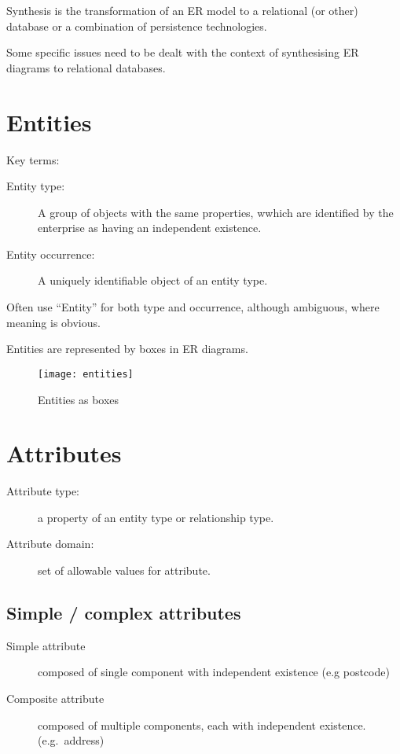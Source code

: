 \documentclass[slides]{pgnotes}
\begin{document}
Synthesis is the transformation of an ER model to a relational (or
other) database or a combination of persistence technologies.

Some specific issues need to be dealt with the context of synthesising ER
diagrams to relational databases.


\section{Entities}
\label{entities}

Key terms:

\begin{description}
\item[Entity type:]
A group of objects with the same properties, wwhich are identified by
the enterprise as having an independent existence.
\item[Entity occurrence:]
A uniquely identifiable object of an entity type.
\end{description}

Often use ``Entity'' for both type and occurrence, although ambiguous,
where meaning is obvious.

Entities are represented by boxes in ER diagrams.

\newpage 

\begin{figure}[htbp]
\centering
\texttt{[image: entities]}
\caption{Entities as boxes}
\end{figure}

\section{Attributes}
\label{attributes}

\begin{description}
\item[Attribute type:]
a property of an entity type or relationship type.
\item[Attribute domain:]
set of allowable values for attribute.
\end{description}


\subsection{Simple / complex attributes}
\label{simple-complex-attributes}

\begin{description}
\item[Simple attribute]
composed of single component with independent existence (e.g postcode)
\item[Composite attribute]
composed of multiple components, each with independent existence.
(e.g.~address)
\end{description}
\end{document}
